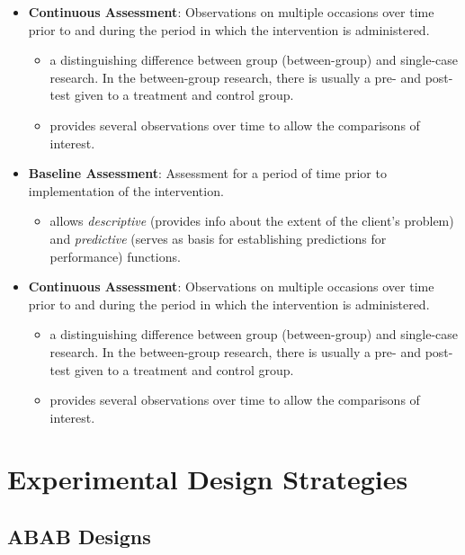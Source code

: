 \documentclass[
  english,
]{book}
\providecommand{\tightlist}{%
  \setlength{\itemsep}{0pt}\setlength{\parskip}{0pt}}
\begin{document}
\begin{itemize}
\tightlist
\item
  \textbf{Continuous Assessment}: Observations on multiple occasions over time prior to and during the period in which the intervention is administered.

  \begin{itemize}
  \tightlist
  \item
    a distinguishing difference between group (between-group) and single-case research. In the between-group research, there is usually a pre- and post- test given to a treatment and control group.
  \item
    provides several observations over time to allow the comparisons of interest.
  \end{itemize}
\item
  \textbf{Baseline Assessment}: Assessment for a period of time prior to implementation of the intervention.

  \begin{itemize}
  \tightlist
  \item
    allows \emph{descriptive} (provides info about the extent of the client's problem) and \emph{predictive} (serves as basis for establishing predictions for performance) functions.
  \end{itemize}
\item
  \textbf{Continuous Assessment}: Observations on multiple occasions over time prior to and during the period in which the intervention is administered.

  \begin{itemize}
  \tightlist
  \item
    a distinguishing difference between group (between-group) and single-case research. In the between-group research, there is usually a pre- and post- test given to a treatment and control group.
  \item
    provides several observations over time to allow the comparisons of interest.
  \end{itemize}
\end{itemize}

\hypertarget{experimental-design-strategies}{%
\section{Experimental Design Strategies}\label{experimental-design-strategies}}

\hypertarget{abab-designs}{%
\subsection{ABAB Designs}\label{abab-designs}}
\end{document}
